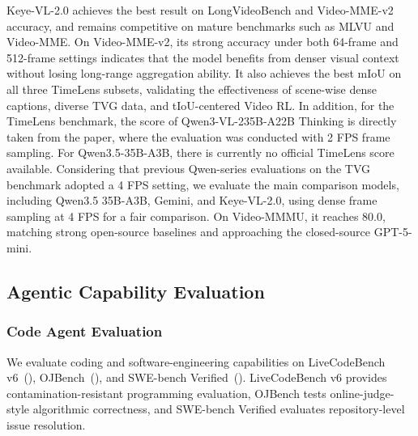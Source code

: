 \documentclass{article} %
\begin{document}
Keye-VL-2.0 achieves the best result on LongVideoBench and Video-MME-v2 accuracy, and remains competitive on mature benchmarks such as MLVU and Video-MME. On Video-MME-v2, its strong accuracy under both 64-frame and 512-frame settings indicates that the model benefits from denser visual context without losing long-range aggregation ability. It also achieves the best mIoU on all three TimeLens subsets, validating the effectiveness of scene-wise dense captions, diverse TVG data, and tIoU-centered Video RL. In addition, for the TimeLens benchmark, the score of Qwen3-VL-235B-A22B Thinking is directly taken from the paper, where the evaluation was conducted with 2 FPS frame sampling. For Qwen3.5-35B-A3B, there is currently no official TimeLens score available. Considering that previous Qwen-series evaluations on the TVG benchmark adopted a 4 FPS setting, we evaluate the main comparison models, including Qwen3.5 35B-A3B, Gemini, and Keye-VL-2.0, using dense frame sampling at 4 FPS for a fair comparison. On Video-MMMU, it reaches $80.0$, matching strong open-source baselines and approaching the closed-source GPT-5-mini.

\subsection{Agentic Capability Evaluation}

\subsubsection{Code Agent Evaluation}

We evaluate coding and software-engineering capabilities on LiveCodeBench v6~(\cite{livecodebench}), OJBench~(\cite{ojbench}), and SWE-bench Verified~(\cite{swe_bench_verified}). LiveCodeBench v6 provides contamination-resistant programming evaluation, OJBench tests online-judge-style algorithmic correctness, and SWE-bench Verified evaluates repository-level issue resolution.
\end{document}
